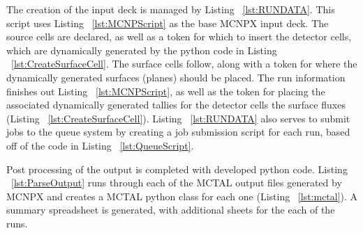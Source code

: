 \label{sec:RPM8Listings}
The creation of the input deck is managed by Listing ~\ref{lst:RUNDATA}.
This script uses Listing ~\ref{lst:MCNPScript} as the base MCNPX input deck.
The source cells are declared, as well as a token for which to insert the detector cells, which are dynamically generated by the python code in Listing ~\ref{lst:CreateSurfaceCell}.
The surface cells follow, along with a token for where the dynamically generated surfaces (planes) should be placed.
The run information finishes out Listing ~\ref{lst:MCNPScript}, as well as the token for placing the associated dynamically generated tallies for the detector cells the surface fluxes (Listing ~\ref{lst:CreateSurfaceCell}).
Listing ~\ref{lst:RUNDATA} also serves to submit jobs to the queue system by creating a job submission script for each run, based off of the code in Listing ~\ref{lst:QueueScript}.

Post processing of the output is completed with developed python code.
Listing ~\ref{lst:ParseOutput} runs through each of the MCTAL output files generated by MCNPX and creates a MCTAL python class for each one (Listing ~\ref{lst:mctal}).
A summary spreadsheet is generated, with additional sheets for the each of the runs.









